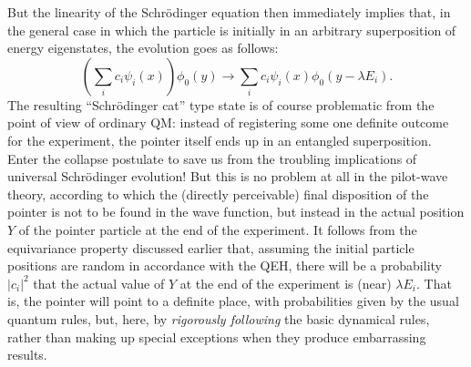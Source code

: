 \documentclass[aps,prc,onecolumn,letterpaper,floatfix,12pt]{revtex4}
\begin{document}
But the linearity of the Schr\"odinger equation then
immediately implies that, in the general case in which the particle is
initially in an arbitrary superposition of energy eigenstates, the
evolution goes as follows:
\begin{equation}
\left( \sum_i c_i \psi_i(x) \right) \phi_0(y) \rightarrow \sum_i c_i
\psi_i(x) \phi_0(y - \lambda E_i).
\end{equation}
The resulting ``Schr\"odinger cat'' type state is of course problematic from
the point of view of ordinary QM:  instead of registering some one
definite outcome for the experiment, the pointer itself ends up in an
entangled superposition.  Enter the collapse postulate to save us from
the troubling implications of universal Schr\"odinger evolution!  
But this is no problem at all in the
pilot-wave theory, according to which the (directly perceivable) final
disposition of the pointer is not to be found in the wave function,
but instead in the actual position $Y$ of the pointer particle
at the end of the experiment.
It follows from the equivariance property discussed earlier
that, assuming the initial particle positions are random in accordance
with the QEH,
there will be a probability $|c_i|^2$ that the actual
value of $Y$ at the end of the experiment is (near) $\lambda E_i$.
That is, the pointer will point to a definite place, with
probabilities given by the usual quantum rules, but, here, by
\emph{rigorously following} the basic dynamical rules, rather than
making up special exceptions when they produce embarrassing results.
\end{document}
